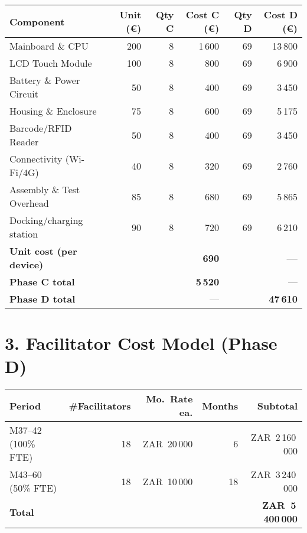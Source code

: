 \documentclass[a4paper,11pt]{article}
\begin{document}
\begin{tabularx}{\textwidth}{Xrrrrr}
\toprule
\textbf{Component}           & \textbf{Unit (€)} & \textbf{Qty C} & \textbf{Cost C (€)} & \textbf{Qty D} & \textbf{Cost D (€)} \\
\midrule
Mainboard \& CPU             & 200               & 8              & 1\,600               & 69             & 13\,800              \\
LCD Touch Module             & 100               & 8              &   800                & 69             &  6\,900              \\
Battery \& Power Circuit     &  50               & 8              &   400                & 69             &  3\,450              \\
Housing \& Enclosure         &  75               & 8              &   600                & 69             &  5\,175              \\
Barcode/RFID Reader          &  50               & 8              &   400                & 69             &  3\,450              \\
Connectivity (Wi-Fi/4G)      &  40               & 8              &   320                & 69             &  2\,760              \\
Assembly \& Test Overhead    &  85               & 8              &   680                & 69             &  5\,865 \\
Docking/charging station     &  90               & 8              &   720                & 69             &  6\,210 \\
\midrule
\textbf{Unit cost (per device)} &           &                & \textbf{690}         &                & \textbf{—}          \\
\textbf{Phase C total}       &                   &                & \textbf{5\,520}      &                & —                    \\
\textbf{Phase D total}       &                   &                & —                    &                & \textbf{47\,610}     \\
\bottomrule
\end{tabularx}

\section*{3. Facilitator Cost Model (Phase D)}
\begin{tabularx}{\textwidth}{Xrrrr}
\toprule
\textbf{Period} & \textbf{\#Facilitators} & \textbf{Mo.\ Rate ea.} & \textbf{Months} & \textbf{Subtotal} \\
\midrule
M37--42 (100\% FTE) & 18 & ZAR~20\,000 & 6  & ZAR~2\,160\,000 \\
M43--60 (50\% FTE)  & 18 & ZAR~10\,000 & 18 & ZAR~3\,240\,000 \\
\midrule
\textbf{Total}     &    &             &    & \textbf{ZAR~5\,400\,000} \\
\bottomrule
\end{tabularx}
\end{document}
